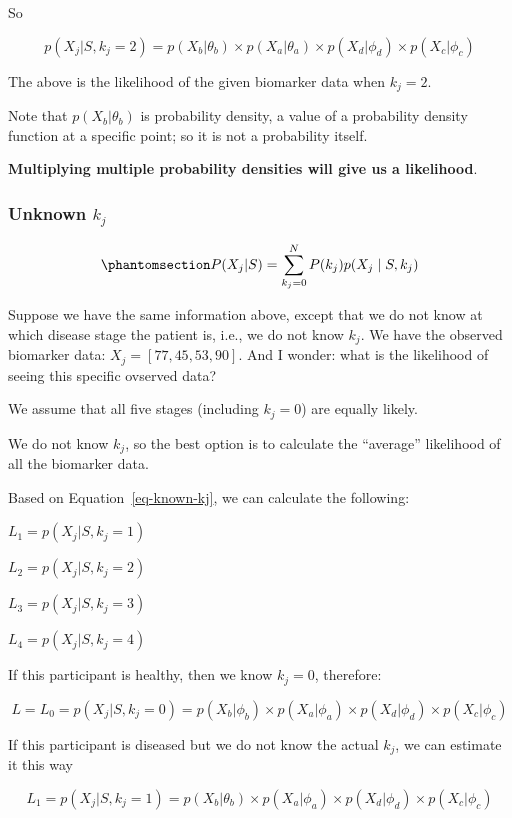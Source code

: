 \documentclass[
  letterpaper,
  DIV=11,
  numbers=noendperiod]{scrreprt}
\begin{document}
So

\[p(X_j | S, k_j = 2) = p (X_b | \theta_b) \times p (X_a | \theta_a) \times p (X_d | \phi_d) \times p (X_c | \phi_c)\]

The above is the likelihood of the given biomarker data when
\(k_j = 2\).

Note that \(p (X_b | \theta_b)\) is probability density, a value of a
probability density function at a specific point; so it is not a
probability itself.

\textbf{Multiplying multiple probability densities will give us a
likelihood}.

\subsubsection{\texorpdfstring{Unknown
\(k_j\)}{Unknown k\_j}}\label{unknown-k_j}

\begin{equation}\phantomsection\label{eq-unknown-kj}{
P(X_{j} | S) = \sum_{k_j=0}^N{P(k_j) p(X_{j} \mid S, k_j)}
}\end{equation}

Suppose we have the same information above, except that we do not know
at which disease stage the patient is, i.e., we do not know \(k_j\). We
have the observed biomarker data: \(X_j = [77, 45, 53, 90]\). And I
wonder: what is the likelihood of seeing this specific ovserved data?

We assume that all five stages (including \(k_j = 0\)) are equally
likely.

We do not know \(k_j\), so the best option is to calculate the
``average'' likelihood of all the biomarker data.

Based on Equation~\ref{eq-known-kj}, we can calculate the following:

\(L_1 = p(X_j | S, k_j = 1)\)

\(L_2 = p(X_j | S, k_j = 2)\)

\(L_3 = p(X_j | S, k_j = 3)\)

\(L_4 = p(X_j | S, k_j = 4)\)

If this participant is healthy, then we know \(k_j = 0\), therefore:

\[L = L_0 = p(X_j | S, k_j = 0) = p (X_b | \phi_b) \times p (X_a | \phi_a) \times p (X_d | \phi_d) \times p (X_c | \phi_c)\]

If this participant is diseased but we do not know the actual \(k_j\),
we can estimate it this way

\[L_1 = p(X_j | S, k_j = 1) = p (X_b | \theta_b) \times p (X_a | \phi_a) \times p (X_d | \phi_d) \times p (X_c | \phi_c)\]
\end{document}
